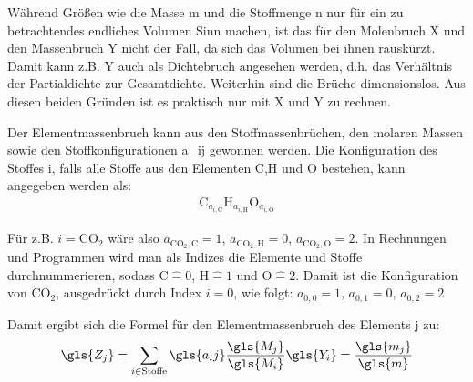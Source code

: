 Während Größen wie die Masse \gls{m} und die Stoffmenge \gls{n} nur für ein zu betrachtendes endliches Volumen Sinn machen, ist das für den Molenbruch \gls{X} und den Massenbruch \gls{Y} nicht der Fall, da sich das Volumen bei ihnen rauskürzt. Damit kann z.B. \gls{Y} auch als Dichtebruch angesehen werden, d.h. das Verhältnis der Partialdichte zur Gesamtdichte. Weiterhin sind die Brüche dimensionslos. Aus diesen beiden Gründen ist es praktisch nur mit \gls{X} und \gls{Y} zu rechnen.

Der Elementmassenbruch kann aus den Stoffmassenbrüchen, den molaren Massen sowie den Stoffkonfigurationen \gls{a_ij} gewonnen werden. Die Konfiguration des Stoffes \gls{i}, falls alle Stoffe aus den Elementen C,H und O bestehen, kann angegeben werden als:
\begin{align}
    \label{eq:defaij}
    \mathrm{C}_{a_{i,\mathrm{C}}} \mathrm{H}_{a_{i,\mathrm{H}}} \mathrm{O}_{a_{i,\mathrm{O}}}
\end{align}

Für z.B. $i=\mathrm{CO}_2$ wäre also $a_{\mathrm{CO}_2,\mathrm{C}}=1$, $a_{\mathrm{CO}_2,\mathrm{H}}=0$, $a_{\mathrm{CO}_2,\mathrm{O}}=2$. In Rechnungen und Programmen wird man als Indizes die Elemente und Stoffe durchnummerieren, sodass $\mathrm{C}\hat{=}0$, $\mathrm{H}\hat{=}1$ und $\mathrm{O}\hat{=}2$. Damit ist die Konfiguration von $\mathrm{CO}_2$, ausgedrückt durch Index $i=0$, wie folgt: $a_{0,0}=1$, $a_{0,1}=0$, $a_{0,2}=2$

Damit ergibt sich die Formel für den Elementmassenbruch des Elements \gls{j} zu:
\begin{align}
    \label{eq:zfromy}
    \gls{Z_j}
    = \sum\limits_{i \in \text{Stoffe}} \gls{a_ij} \frac{\gls{M_j}}{\gls{M_i}} \gls{Y_i}
    = \frac{\gls{m_j}}{\gls{m}}
\end{align}



